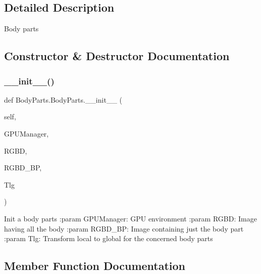 \subsection{Detailed Description}
\begin{DoxyVerb}Body parts
\end{DoxyVerb}
 

\subsection{Constructor \& Destructor Documentation}
\mbox{\label{class_body_parts_1_1_body_parts_a1d480c13f6791c93e0da18d6da99a785}} 
\subsubsection{\texorpdfstring{\+\_\+\+\_\+init\+\_\+\+\_\+()}{\_\_init\_\_()}}
{\footnotesize\ttfamily def Body\+Parts.\+Body\+Parts.\+\_\+\+\_\+init\+\_\+\+\_\+ (\begin{DoxyParamCaption}\item[{}]{self,  }\item[{}]{G\+P\+U\+Manager,  }\item[{}]{R\+G\+BD,  }\item[{}]{R\+G\+B\+D\+\_\+\+BP,  }\item[{}]{Tlg }\end{DoxyParamCaption})}

\begin{DoxyVerb}Init a body parts
:param GPUManager: GPU environment
:param RGBD: Image having all the body
:param RGBD_BP: Image containing just the body part
:param Tlg: Transform local to global for the concerned body parts
\end{DoxyVerb}
 

\subsection{Member Function Documentation}
\mbox{\label{class_body_parts_1_1_body_parts_a42e88badcb71b203213ef853ff7aa291}} 
